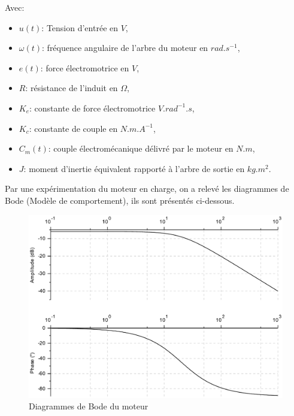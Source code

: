 Avec: 
\begin{itemize}
 \item $u(t)$: Tension d'entrée en $V$,
 \item $\omega(t)$: fréquence angulaire de l'arbre du moteur en $rad.s^{-1}$,
 \item $e(t)$: force électromotrice en $V$,
 \item $R$: résistance de l'induit en $\Omega$,
 \item $K_e$: constante de force électromotrice $V.rad^{-1}.s$,
 \item $K_c$: constante de couple en $N.m.A^{-1}$,
 \item $C_m(t)$: couple électromécanique délivré par le moteur en $N.m$,
 \item $J$: moment d'inertie équivalent rapporté à l'arbre de sortie en $kg.m^2$.
\end{itemize}




\newpage

Par une expérimentation du moteur en charge, on a relevé les diagrammes de Bode (Modèle de comportement), ils sont présentés ci-dessous.

\begin{figure}[!h]
\begin{center}
	\includegraphics[width=0.7\linewidth]{img/fig05a}
\end{center}
\caption{Diagrammes de Bode du moteur}
\label{fig05a}
\end{figure} 

